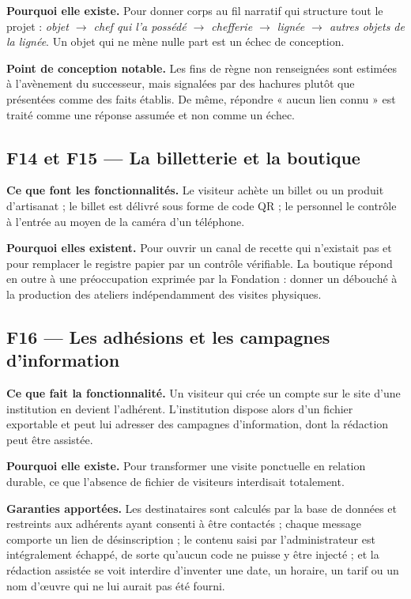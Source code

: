 \textbf{Pourquoi elle existe.} Pour donner corps au fil narratif qui structure
tout le projet : \emph{objet $\rightarrow$ chef qui l'a possédé $\rightarrow$
chefferie $\rightarrow$ lignée $\rightarrow$ autres objets de la lignée}. Un
objet qui ne mène nulle part est un échec de conception.

\textbf{Point de conception notable.} Les fins de règne non renseignées sont
estimées à l'avènement du successeur, mais signalées par des hachures plutôt que
présentées comme des faits établis. De même, répondre « aucun lien connu » est
traité comme une réponse assumée et non comme un échec.

\subsection{F14 et F15 — La billetterie et la boutique}

\textbf{Ce que font les fonctionnalités.} Le visiteur achète un billet ou un
produit d'artisanat ; le billet est délivré sous forme de code QR ; le personnel
le contrôle à l'entrée au moyen de la caméra d'un téléphone.

\textbf{Pourquoi elles existent.} Pour ouvrir un canal de recette qui n'existait
pas et pour remplacer le registre papier par un contrôle vérifiable. La boutique
répond en outre à une préoccupation exprimée par la Fondation : donner un
débouché à la production des ateliers indépendamment des visites physiques.

\subsection{F16 — Les adhésions et les campagnes d'information}

\textbf{Ce que fait la fonctionnalité.} Un visiteur qui crée un compte sur le
site d'une institution en devient l'adhérent. L'institution dispose alors d'un
fichier exportable et peut lui adresser des campagnes d'information, dont la
rédaction peut être assistée.

\textbf{Pourquoi elle existe.} Pour transformer une visite ponctuelle en
relation durable, ce que l'absence de fichier de visiteurs interdisait
totalement.

\textbf{Garanties apportées.} Les destinataires sont calculés par la base de
données et restreints aux adhérents ayant consenti à être contactés ; chaque
message comporte un lien de désinscription ; le contenu saisi par
l'administrateur est intégralement échappé, de sorte qu'aucun code ne puisse y
être injecté ; et la rédaction assistée se voit interdire d'inventer une date,
un horaire, un tarif ou un nom d'œuvre qui ne lui aurait pas été fourni.

